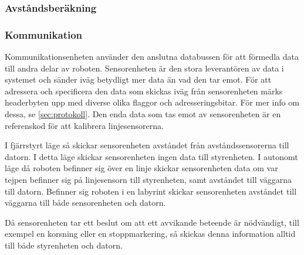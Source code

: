 \subsubsection{Avståndsberäkning}


\subsubsection{Kommunikation}
Kommunikationsenheten använder den anslutna databussen för att förmedla 
data till andra delar av roboten. Sensorenheten är den stora leverantören av 
data i systemet och sänder iväg betydligt mer data än vad den tar emot. För att 
adressera och specificera den data som skickas iväg från sensorenheten märks 
headerbyten upp med diverse olika flaggor och adresseringsbitar. För mer info om 
dessa, se \ref{sec:protokoll}. Den enda data som tas emot av sensorenheten är en 
referenskod för att kalibrera linjesensorerna.

I fjärrstyrt läge så skickar sensorenheten avståndet från avståndssensorerna 
till datorn.  I detta läge skickar sensorenheten ingen data till styrenheten. 
I autonomt läge då roboten befinner sig över en linje skickar sensorenheten data om 
var tejpen befinner sig på linjesensorn till styrenheten, samt avståndet till 
väggarna till datorn. Befinner sig roboten i en labyrint skickar 
sensorenheten avståndet till väggarna till både sensorenheten och datorn.  

Då sensorenheten tar ett beslut om att ett avvikande beteende är nödvändigt, till exempel 
en korsning eller en stoppmarkering, så skickas denna information alltid till 
både styrenheten och datorn.


